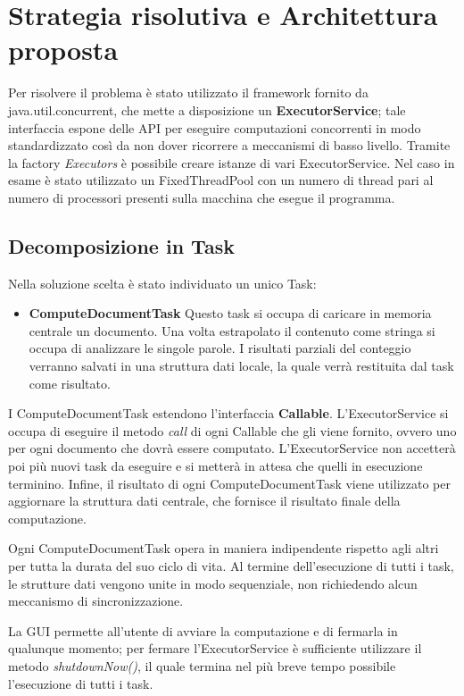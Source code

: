 \section{Strategia risolutiva e Architettura proposta}
Per risolvere il problema è stato utilizzato il framework fornito da java.util.concurrent, che mette a disposizione un \textbf{ExecutorService}; tale interfaccia espone delle API per eseguire computazioni concorrenti in modo standardizzato così da non dover ricorrere a meccanismi di basso livello.\newline
Tramite la factory \textit{Executors} è possibile creare istanze di vari ExecutorService. Nel caso in esame è stato utilizzato un FixedThreadPool con un numero di thread pari al numero di processori presenti sulla macchina che esegue il programma.
\subsection{Decomposizione in Task}
Nella soluzione scelta è stato individuato un unico Task:
\begin{itemize}
    \item \textbf{ComputeDocumentTask} \newline
    Questo task si occupa di caricare in memoria centrale un documento. Una volta estrapolato il contenuto come stringa si occupa di analizzare le singole parole. I risultati parziali del conteggio verranno salvati in una struttura dati locale, la quale verrà restituita dal task come risultato.
\end{itemize}

\noindent I ComputeDocumentTask estendono l'interfaccia \textbf{Callable}. L'ExecutorService si occupa di eseguire il metodo \textit{call} di ogni Callable che gli viene fornito, ovvero uno per ogni documento che dovrà essere computato. L'ExecutorService non accetterà poi più nuovi task da eseguire e si metterà in attesa che quelli in esecuzione terminino.\newline
Infine, il risultato di ogni ComputeDocumentTask viene utilizzato per aggiornare la struttura dati centrale, che fornisce il risultato finale della computazione.\newline

\noindent Ogni ComputeDocumentTask opera in maniera indipendente rispetto agli altri per tutta la durata del suo ciclo di vita. Al termine dell'esecuzione di tutti i task, le strutture dati vengono unite in modo sequenziale, non richiedendo alcun meccanismo di sincronizzazione.\newline

\noindent La GUI permette all'utente di avviare la computazione e di fermarla in qualunque momento; per fermare l'ExecutorService è sufficiente utilizzare il metodo \textit{shutdownNow()}, il quale termina nel più breve tempo possibile l'esecuzione di tutti i task.\newline

